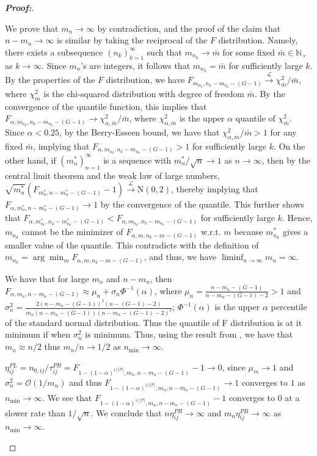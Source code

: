 \documentclass[times,sort&compress,3p]{elsarticle}
\theoremstyle{plain}%
\theoremstyle{definition}
\begin{document}
\begin{proof}[\textbf{\upshape Proof:}]
\begin{description}
{\color{blue}
We prove that $m_n\to\infty$ by contradiction, and the proof of the claim that $n - m_n\to\infty$ is similar by taking the reciprocal of the $F$ distribution. Namely, there exists a subsequence $(n_k)_{k = 1}^\infty$ such that $m_{n_k}\to \bar{m}$ for some fixed $\bar{m}\in\mathbb{N}_+$ as $k\to\infty$. Since $m_n$'s are integers, it follows that $m_{n_k} = \bar{m}$ for sufficiently large $k$. By the properties of the $F$ distribution, we have $F_{m_{n_k}, n_k - m_{n_k} - (G - 1)} \overset{\mathcal{L}}{\to} \chi^2_{\bar{m}}/\bar{m}$, where $\chi^2_{\bar{m}}$ is the chi-squared distribution with degree of freedom $\bar{m}$. By the convergence of the quantile function, this implies that $F_{\alpha, m_{n_k}, n_k - m_{n_k} - (G - 1)}\to \chi_{\alpha,\bar{m}}^2/\bar{m}$, where $\chi_{\alpha,\bar{m}}^2$ is the upper $\alpha$ quantile of $\chi_{\bar{m}}^2$. Since $\alpha < 0.25$, by the Berry-Esseen bound, we have that $\chi_{\alpha,\bar{m}}^2/\bar{m} > 1$ for any fixed $\bar{m}$, implying that $F_{\alpha, m_{n_k}, n_k - m_{n_k} - (G - 1)} > 1$ for sufficiently large $k$. On the other hand, if $(m_n^*)_{n = 1}^\infty$ is a sequence with $m^*_n/\sqrt{n}\to 1$ as $n\to\infty$, then by the central limit theorem and the weak law of large numbers, $\sqrt{m_n^*}(F_{m_n^*,n - m_n^* - (G - 1)} - 1)\overset{\mathcal{L}}{\to}\mathrm{N}(0, 2)$, thereby implying that $F_{\alpha, m_n^*, n - m_n^* - (G - 1)}\to 1$ by the convergence of the quantile. This further shows that $F_{\alpha, m_{n_k}^*, n_k - m_{n_k}^* - (G - 1)} < F_{\alpha, m_{n_k}, n_k - m_{n_k} - (G - 1)}$ for sufficiently large $k$. Hence, $m_{n_k}$ cannot be the minimizer of $F_{\alpha, m, n_k - m - (G - 1)}$ w.r.t. $m$ because $m_{n_k}^*$ gives a smaller value of the quantile. This contradicts with the definition of $m_{n_k} = \arg\min_mF_{\alpha, m, n_k - m - (G - 1)}$, and thus, we have $\liminf_{n\to\infty}m_n = \infty$.
}

We have that for large $m_n$ and $n-m_n$, then $F_{\alpha, m_n, n-m_n-(G-1)} \approx \mu_n + \sigma_n\Phi^{-1}(\alpha)$, where $\mu_n = \frac{n-m_n-(G-1)}{n-m_n-(G-1) - 2} > 1$ and $\sigma^2_n = \frac{2(n-m_n-(G-1))^2 (n-(G-1)-2)}{m_n(n-m_n-(G-1))(n-m_n-(G-1)-2)^2}$; $\Phi^{-1}(\alpha)$ is the upper $\alpha$ percentile of the standard normal distribution. Thus the quantile of F distribution is at it minimum if when $\sigma^2_n$ is minimum. Thus, using the result from \cite{zoh2018powerful}, we have that $m_n \approx n/2$ thus $m_n/n \rightarrow 1/2$ as $n_{\min} \rightarrow \infty$. 

$\eta^{PL}_{ij} = n_{0,ij}/\tau^{PR}_{ij} = F_{1-(1-\alpha)^{1/|\mathcal{P}|},m_n, n-m_n-(G-1)} - 1 \rightarrow 0$, since $\mu_m \rightarrow 1$ and $\sigma^2_n = \mathcal{O}(1/m_n)$ and thus  $F_{1-(1-\alpha)^{1/|\mathcal{P}|},m_n, n-m_n-(G-1)} \rightarrow 1$ converges to $1$ as $n_{\min} \rightarrow \infty$. 
We see that $F_{1-(1-\alpha)^{1/|\mathcal{P}|}, m_n, n-m_n-(G-1)} -1 $ converges to 0 at a slower rate than $1/\sqrt{n}$. We conclude that $n\eta^{PR}_{ij} \rightarrow \infty$ and $m_{n}\eta^{PR}_{ij} \rightarrow \infty$ as $n_{\min} \rightarrow \infty.$


\end{description}
\end{proof}
\end{document}

